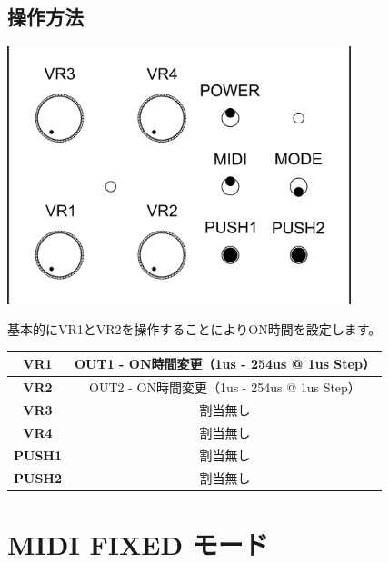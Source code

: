 \documentclass[a4paper,11pt]{jsarticle}
\begin{document}
\subsection{操作方法}

\vspace*{5mm}
\begin{center}
\includegraphics[width=100mm]{image/Arduino_Interrupter_v1_Design_MIDI.png}
\end{center}
\vspace*{5mm}

基本的にVR1とVR2を操作することによりON時間を設定します。

\vspace*{5mm}

\begin{table}[htbp]
\begin{center}
\begin{tabular}{ | c | c | }
\hline
\textbf{VR1} & OUT1 - ON時間変更（1us - 254us @ 1us Step） \\\hline
\textbf{VR2} & OUT2 - ON時間変更（1us - 254us @ 1us Step） \\\hline
\textbf{VR3} & 割当無し \\\hline
\textbf{VR4} & 割当無し \\\hline
\textbf{PUSH1} & 割当無し \\\hline
\textbf{PUSH2} & 割当無し \\\hline
\end{tabular}
\end{center}
\end{table}



\clearpage

\section{MIDI FIXED モード}
\end{document}
